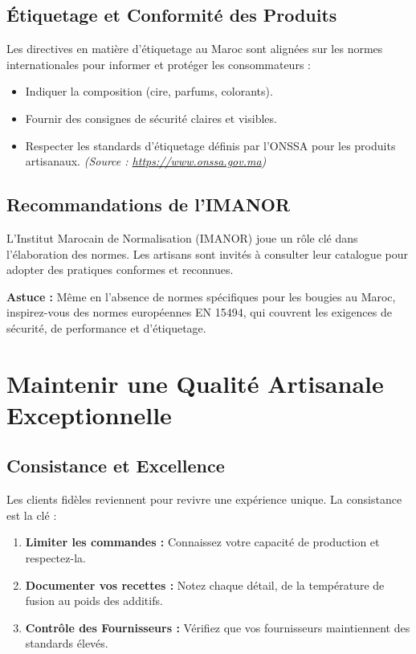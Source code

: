 \documentclass[11pt,fleqn,onecolumn,oneside]{book}
\begin{document}
\subsection*{Étiquetage et Conformité des Produits}

Les directives en matière d’étiquetage au Maroc sont alignées sur les normes internationales pour informer et protéger les consommateurs :
\begin{itemize}
    \item Indiquer la composition (cire, parfums, colorants).
    \item Fournir des consignes de sécurité claires et visibles.
    \item Respecter les standards d’étiquetage définis par l’ONSSA pour les produits artisanaux. \textit{(Source : \url{https://www.onssa.gov.ma})}
\end{itemize}

\subsection*{Recommandations de l'IMANOR}

L'Institut Marocain de Normalisation (IMANOR) joue un rôle clé dans l’élaboration des normes. Les artisans sont invités à consulter leur catalogue pour adopter des pratiques conformes et reconnues.

\begin{remark}
\textbf{Astuce :} Même en l’absence de normes spécifiques pour les bougies au Maroc, inspirez-vous des normes européennes EN 15494, qui couvrent les exigences de sécurité, de performance et d’étiquetage.
\end{remark}

\section{Maintenir une Qualité Artisanale Exceptionnelle}

\subsection*{Consistance et Excellence}

Les clients fidèles reviennent pour revivre une expérience unique. La consistance est la clé :
\begin{enumerate}
    \item \textbf{Limiter les commandes :} Connaissez votre capacité de production et respectez-la.
    \item \textbf{Documenter vos recettes :} Notez chaque détail, de la température de fusion au poids des additifs.
    \item \textbf{Contrôle des Fournisseurs :} Vérifiez que vos fournisseurs maintiennent des standards élevés.
\end{enumerate}
\end{document}
